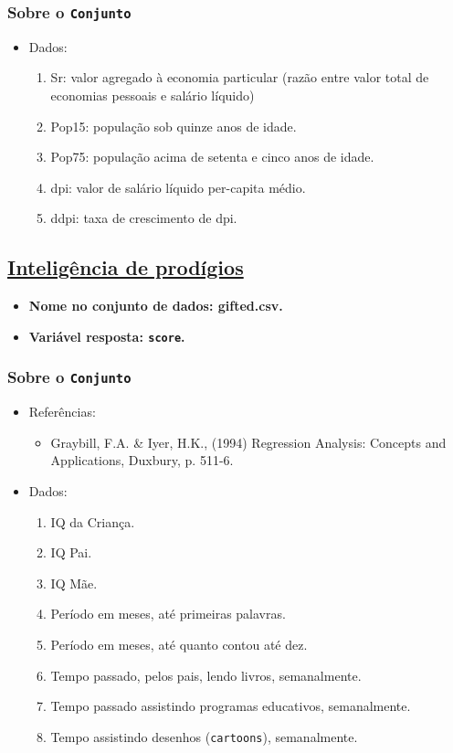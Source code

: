 \documentclass[11pt]{article}
\begin{document}
\subsubsection{Sobre o \texttt{Conjunto}}
\label{sec:org59141d4}
\begin{itemize}
\item Dados:
\begin{enumerate}
\item Sr: valor agregado à economia particular (razão entre valor total de economias pessoais e salário líquido)
\item Pop15: população sob quinze anos de idade.
\item Pop75: população acima de setenta e cinco anos de idade.
\item dpi: valor de salário líquido per-capita médio.
\item ddpi: taxa de crescimento de dpi.
\end{enumerate}
\end{itemize}


\subsection{\href{https://www.openintro.org/data/index.php?data=gifted}{Inteligência de prodígios}}
\label{sec:org05daee5}
\begin{itemize}
\item \textbf{Nome no conjunto de dados: \textbf{gifted.csv}.}
\item \textbf{Variável resposta: \texttt{score}.}
\end{itemize}
\subsubsection{Sobre o \texttt{Conjunto}}
\label{sec:org4fc54d1}
\begin{itemize}
\item Referências:
\begin{itemize}
\item Graybill, F.A. \& Iyer, H.K., (1994) Regression Analysis: Concepts and Applications, Duxbury, p. 511-6.
\end{itemize}
\item Dados:
\begin{enumerate}
\item IQ da Criança.
\item IQ Pai.
\item IQ Mãe.
\item Período em meses, até primeiras palavras.
\item Período em meses, até quanto contou até dez.
\item Tempo passado, pelos pais, lendo livros, semanalmente.
\item Tempo passado assistindo programas educativos, semanalmente.
\item Tempo assistindo desenhos (\texttt{cartoons}), semanalmente.
\end{enumerate}
\end{itemize}
\end{document}
